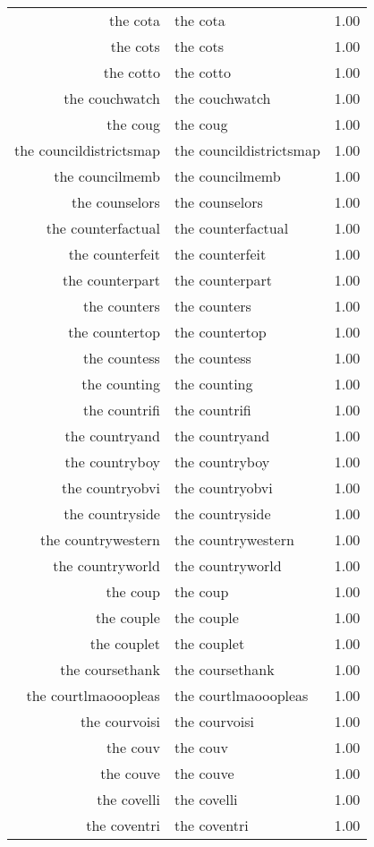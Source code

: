 \begin{table}[ht]
\begin{tabular}{rlr}
  the cota & the cota & 1.00 \\ 
  the cots & the cots & 1.00 \\ 
  the cotto & the cotto & 1.00 \\ 
  the couchwatch & the couchwatch & 1.00 \\ 
  the coug & the coug & 1.00 \\ 
  the councildistrictsmap & the councildistrictsmap & 1.00 \\ 
  the councilmemb & the councilmemb & 1.00 \\ 
  the counselors & the counselors & 1.00 \\ 
  the counterfactual & the counterfactual & 1.00 \\ 
  the counterfeit & the counterfeit & 1.00 \\ 
  the counterpart & the counterpart & 1.00 \\ 
  the counters & the counters & 1.00 \\ 
  the countertop & the countertop & 1.00 \\ 
  the countess & the countess & 1.00 \\ 
  the counting & the counting & 1.00 \\ 
  the countrifi & the countrifi & 1.00 \\ 
  the countryand & the countryand & 1.00 \\ 
  the countryboy & the countryboy & 1.00 \\ 
  the countryobvi & the countryobvi & 1.00 \\ 
  the countryside & the countryside & 1.00 \\ 
  the countrywestern & the countrywestern & 1.00 \\ 
  the countryworld & the countryworld & 1.00 \\ 
  the coup & the coup & 1.00 \\ 
  the couple & the couple & 1.00 \\ 
  the couplet & the couplet & 1.00 \\ 
  the coursethank & the coursethank & 1.00 \\ 
  the courtlmaooopleas & the courtlmaooopleas & 1.00 \\ 
  the courvoisi & the courvoisi & 1.00 \\ 
  the couv & the couv & 1.00 \\ 
  the couve & the couve & 1.00 \\ 
  the covelli & the covelli & 1.00 \\ 
  the coventri & the coventri & 1.00 \\ 

\end{tabular}
\end{table}
